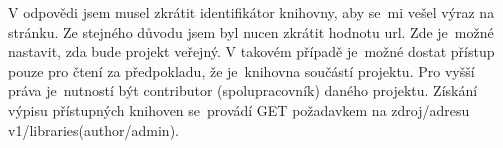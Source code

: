 \par V odpovědi jsem musel zkrátit identifikátor knihovny, aby se~mi vešel výraz na stránku. Ze stejného důvodu jsem byl nucen zkrátit hodnotu url. Zde je~možné nastavit, zda bude projekt veřejný. V takovém případě je~možné dostat přístup pouze pro čtení za předpokladu, že je~knihovna součástí projektu. Pro vyšší práva je~nutností být contributor (spolupracovník) daného projektu. Získání výpisu přístupných knihoven se~provádí GET požadavkem na zdroj/adresu v1/libraries(author/admin).